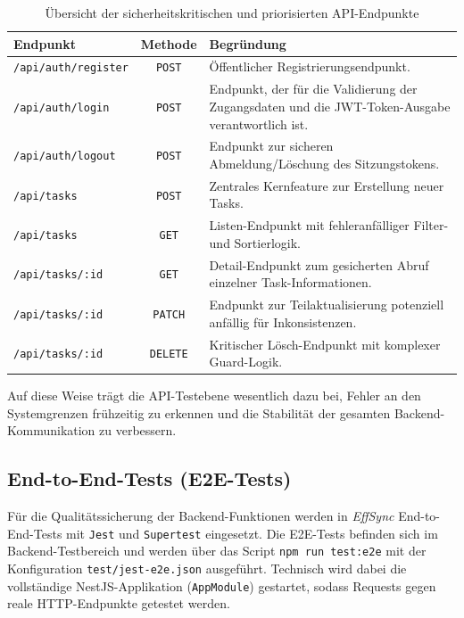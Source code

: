 \begin{table}[H]
    \centering
    \renewcommand{\arraystretch}{1.3}
    \begin{tabular}{|l|c|p{8.5cm}|}
        \hline
        \textbf{Endpunkt} & \textbf{Methode} & \textbf{Begründung } \\
        \hline
        \texttt{/api/auth/register} & \texttt{POST} & Öffentlicher Registrierungsendpunkt. \\
        \hline
        \texttt{/api/auth/login} & \texttt{POST} & Endpunkt, der für die Validierung der Zugangsdaten und die JWT-Token-Ausgabe verantwortlich ist. \\
        \hline
        \texttt{/api/auth/logout} & \texttt{POST} & Endpunkt zur sicheren Abmeldung/Löschung des Sitzungstokens. \\
        \hline
        \texttt{/api/tasks} & \texttt{POST} & Zentrales Kernfeature zur Erstellung neuer Tasks. \\
        \hline
        \texttt{/api/tasks} & \texttt{GET} & Listen-Endpunkt mit fehleranfälliger Filter- und Sortierlogik. \\
        \hline
        \texttt{/api/tasks/:id} & \texttt{GET} & Detail-Endpunkt zum gesicherten Abruf einzelner Task-Informationen. \\
        \hline
        \texttt{/api/tasks/:id} & \texttt{PATCH} & Endpunkt zur Teilaktualisierung potenziell anfällig für Inkonsistenzen. \\
        \hline
        \texttt{/api/tasks/:id} & \texttt{DELETE} & Kritischer Lösch-Endpunkt mit komplexer Guard-Logik. \\
        \hline
    \end{tabular}
    \caption{Übersicht der sicherheitskritischen und priorisierten API-Endpunkte}
    \label{tab:api_endpoints}
\end{table}

Auf diese Weise trägt die API-Testebene wesentlich dazu bei, Fehler an den Systemgrenzen frühzeitig zu erkennen und die Stabilität der gesamten Backend-Kommunikation zu verbessern.

\label{sec:e2e_tests}
\subsection{End-to-End-Tests (E2E-Tests)}
Für die Qualitätssicherung der Backend-Funktionen werden in \textit{EffSync} End-to-End-Tests mit \texttt{Jest} und \texttt{Supertest} eingesetzt. Die E2E-Tests befinden sich im Backend-Testbereich und werden über das Script \texttt{npm run test:e2e} mit der Konfiguration \texttt{test/jest-e2e.json} ausgeführt. Technisch wird dabei die vollständige NestJS-Applikation (\texttt{AppModule}) gestartet, sodass Requests gegen reale HTTP-Endpunkte getestet werden.

